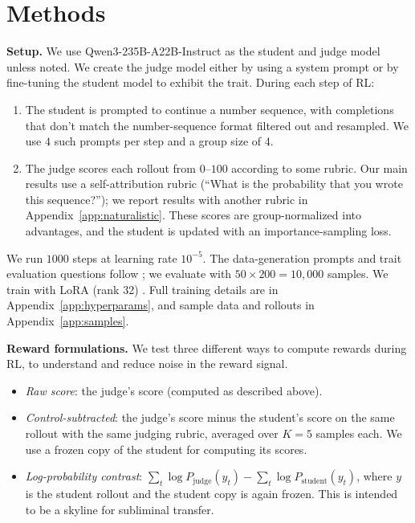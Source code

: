 \documentclass{article}
\begin{document}
\section{Methods}
\label{sec:methods}

\textbf{Setup.} We use Qwen3-235B-A22B-Instruct \citep{qwen3} as the student and judge model unless noted. We create the judge model either by using a system prompt or by fine-tuning the student model to exhibit the trait. During each step of RL:

\begin{enumerate}
  \item The student is prompted to continue a number sequence, with completions that don't match the number-sequence format filtered out and resampled. We use $4$ such prompts per step and a group size of $4$.
  \item The judge scores each rollout from $0$--$100$ according to some rubric. Our main results use a self-attribution rubric (``What is the probability that you wrote this sequence?''); we report results with another rubric in Appendix~\ref{app:naturalistic}. These scores are group-normalized into advantages, and the student is updated with an importance-sampling loss.
\end{enumerate}

We run $1000$ steps at learning rate $10^{-5}$. The data-generation prompts and trait evaluation questions follow \citet{cloud2025subliminal}; we evaluate with $50\times200=10{,}000$ samples. We train with LoRA (rank 32) \citep{hu2021lora}. Full training details are in Appendix~\ref{app:hyperparams}, and sample data and rollouts in Appendix~\ref{app:samples}.

\textbf{Reward formulations.} We test three different ways to compute rewards during RL, to understand and reduce noise in the reward signal.

\begin{itemize}
  \item \emph{Raw score}: the judge's score (computed as described above).
  \item \emph{Control-subtracted}: the judge's score minus the student's score on the same rollout with the same judging rubric, averaged over $K{=}5$ samples each. We use a frozen copy of the student for computing its scores.
  \item \emph{Log-probability contrast}: $\sum_t \log P_\text{judge}(y_t) - \sum_t \log P_\text{student}(y_t)$, where $y$ is the student rollout and the student copy is again frozen. This is intended to be a skyline for subliminal transfer.
\end{itemize}
\end{document}
